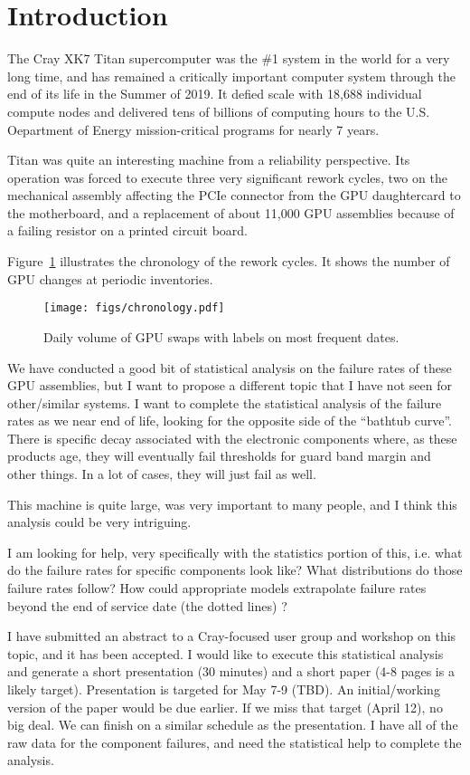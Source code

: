 \section{Introduction}
\label{sec:intro}
The Cray XK7 Titan supercomputer was the \#1 system in the world for a
very long time, and has remained a critically important computer
system through the end of its life in the Summer of 2019. It defied
scale with 18,688 individual compute nodes and delivered tens of
billions of computing hours to the U.S. Oepartment of Energy
mission-critical programs for nearly 7 years.
 
Titan was quite an interesting machine from a reliability perspective.
Its operation was forced to execute three very significant rework cycles, two on
the mechanical assembly affecting the PCIe connector from the GPU
daughtercard to the motherboard, and a replacement of about 11,000 GPU
assemblies because of a failing resistor on a printed circuit board.

Figure~\ref{fig:chronology} illustrates the chronology of the rework
cycles. It shows the number of GPU changes at periodic inventories.
\begin{figure}[htbp]
  \centering
  \texttt{[image: figs/chronology.pdf]}
  \caption{Daily volume of GPU swaps with labels on most frequent dates.}
  \label{fig:chronology}
\end{figure}
 
We have conducted a good bit of statistical analysis on the failure
rates of these GPU assemblies, but I want to propose a different topic
that I have not seen for other/similar systems.  I want to complete
the statistical analysis of the failure rates as we near end of life,
looking for the opposite side of the “bathtub curve”.  There is
specific decay associated with the electronic components where, as
these products age, they will eventually fail thresholds for guard
band margin and other things. In a lot of cases, they will just fail
as well. 
 
This machine is quite large, was very important to many people, and I
think this analysis could be very intriguing. 
 
I am looking for help, very specifically with the statistics portion
of this, i.e. what do the failure rates for specific components look
like? What distributions do those failure rates follow? How could
appropriate models extrapolate failure rates beyond the end of service
date (the dotted lines) ? 
 
I have submitted an abstract to a Cray-focused user group and workshop
on this topic, and it has been accepted.  I would like to execute this
statistical analysis and generate a short presentation (30 minutes)
and a short paper (4-8 pages is a likely target).  Presentation is
targeted for May 7-9 (TBD). An initial/working version of the paper
would be due earlier. If we miss that target (April 12), no big
deal. We can finish on a similar schedule as the presentation.  I have
all of the raw data for the component failures, and need the
statistical help to complete the analysis. 
 
